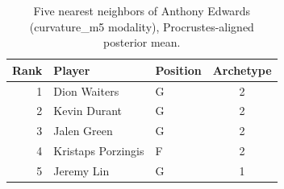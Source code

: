 \begin{table}[htbp]
  \centering\small
  \begin{tabular}{rllc}
    \toprule
    Rank & Player & Position & Archetype \\
    \midrule
    1 & Dion Waiters & G & 2 \\
    2 & Kevin Durant & G & 2 \\
    3 & Jalen Green & G & 2 \\
    4 & Kristaps Porzingis & F & 2 \\
    5 & Jeremy Lin & G & 1 \\
    \bottomrule
  \end{tabular}
  \caption{Five nearest neighbors of Anthony Edwards (curvature_m5 modality), Procrustes-aligned posterior mean.}
  \label{tab:Anthony_Edwards_neighbors_curvature_m5}
\end{table}

